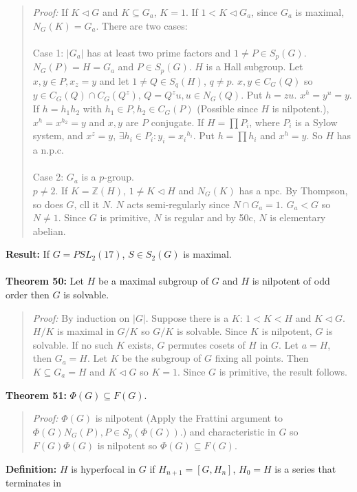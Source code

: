 \begin{quote}
\emph{Proof:}
If $K \lhd G$ and $K \subseteq G_a$, $K = 1$.  If $1 < K \lhd G_a$, since $G_a$ is maximal, $N_G(K)=G_a$.  There
are two cases:\\
\\
Case 1: $|G_a|$ has at least two prime factors and $1 \ne P \in S_p(G)$.\\
$N_G(P)=H=G_a$ and $P \in S_p(G)$.  $H$ is a Hall subgroup.  Let $x, y \in P, x_z=y$ and let $1 \ne Q \in S_q(H)$,
$q \ne p$.  $x, y \in C_G(Q)$ so $y \in C_G(Q) \cap C_G(Q^z)$, $Q=Q^zu, u \in N_G(Q)$.  Put $h =zu$.
$x^h=y^u=y$.  If $h=h_1 h_2$ with $h_1 \in P, h_2 \in C_G(P)$ (Possible since $H$ is nilpotent.), $x^h = x^{h_2}= y$ and $x, y$ are $P$ conjugate.  If $H = \prod P_i$, where $P_i$ is a Sylow system, and
$x^z=y$, $\exists h_i \in P_i: y_i = {x_i}^{h_i}$.  Put $h= \prod h_i$ and $x^h=y$. So $H$ has a n.p.c.
\\
\\
Case 2: $G_a$ is a $p$-group.\\
$p \ne 2$.  If $K = {\mathbb Z}(H)$, $1 \ne K \lhd H$ and $N_G(K)$ has a npc.  By Thompson, so does $G$, cll it $N$.
$N$ acts semi-regularly since $N \cap G_a = 1$.  $G_a < G$ so $N \ne 1$. Since $G$ is primitive, $N$ is regular
and by 50c, $N$ is elementary abelian.
\end{quote}
{\bf Result:} If $G= PSL_{2}(17)$, $S \in S_2(G)$ is maximal.
\\
\\
{\bf Theorem 50:} Let $H$ be a maximal subgroup of $G$ and $H$ is nilpotent of odd order then
$G$ is solvable.
\begin{quote}
\emph{Proof:}
By induction on $|G|$. Suppose there is a $K$: $1 < K < H$ and $K \lhd G$.  $H/K$ is maximal in $G/K$
so $G/K$ is solvable.  Since $K$ is nilpotent, $G$ is solvable. If no such $K$ exists, $G$ permutes cosets
of $H$ in $G$.  Let $a = H$, then $G_a = H$.  Let $K$ be the subgroup of $G$ fixing all points.  Then
$K \subseteq G_a = H$ and $K \lhd G$ so $K = 1$.  Since $G$ is primitive, the result follows.
\end{quote}
{\bf Theorem 51:} $\Phi(G) \subseteq F(G)$.
\begin{quote}
\emph{Proof:} $\Phi(G)$ is nilpotent (Apply the Frattini argument to $\Phi(G)N_G(P), P \in S_p(\Phi(G))$.)
and characteristic in $G$ so $F(G)\Phi(G)$ is nilpotent so
$\Phi(G) \subseteq F(G)$.
\end{quote}
{\bf Definition:} $H$ is hyperfocal in $G$ if $H_{n+1} = [G, H_n]$, $H_0 = H$ is a series that terminates in
